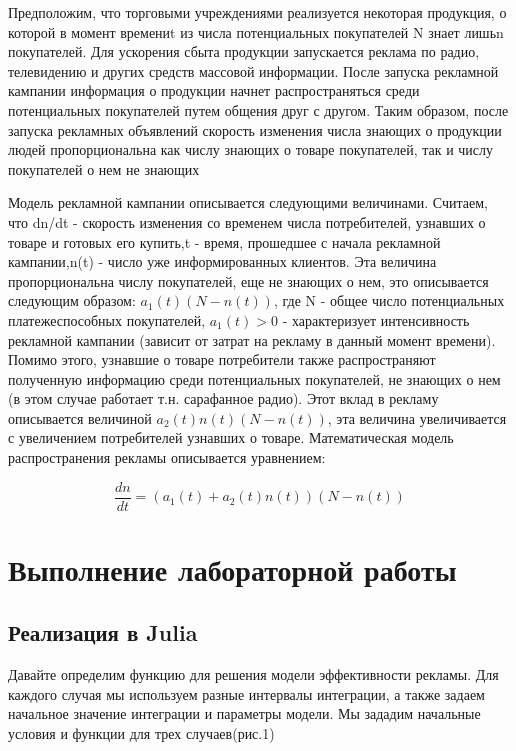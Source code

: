 \documentclass[
  12pt,
  a4paper,
  DIV=11,
  numbers=noendperiod]{scrreprt}
\begin{document}
Предположим, что торговыми учреждениями реализуется некоторая продукция,
о которой в момент времениt из числа потенциальных покупателей N знает
лишьn покупателей. Для ускорения сбыта продукции запускается реклама по
радио, телевидению и других средств массовой информации. После запуска
рекламной кампании информация о продукции начнет распространяться среди
потенциальных покупателей путем общения друг с другом. Таким образом,
после запуска рекламных объявлений скорость изменения числа знающих о
продукции людей пропорциональна как числу знающих о товаре покупателей,
так и числу покупателей о нем не знающих

Модель рекламной кампании описывается следующими величинами. Считаем,
что dn/dt - скорость изменения со временем числа потребителей, узнавших
о товаре и готовых его купить,t - время, прошедшее с начала рекламной
кампании,n(t) - число уже информированных клиентов. Эта величина
пропорциональна числу покупателей, еще не знающих о нем, это описывается
следующим образом: \(a_1(t)(N - n(t))\), где N - общее число
потенциальных платежеспособных покупателей, \(a_1(t) > 0\) -
характеризует интенсивность рекламной кампании (зависит от затрат на
рекламу в данный момент времени). Помимо этого, узнавшие о товаре
потребители также распространяют полученную информацию среди
потенциальных покупателей, не знающих о нем (в этом случае работает т.н.
сарафанное радио). Этот вклад в рекламу описывается величиной
\(a_2(t)n(t)(N - n(t))\), эта величина увеличивается с увеличением
потребителей узнавших о товаре. Математическая модель распространения
рекламы описывается уравнением:

\[
\frac{dn}{dt} = (a_1(t) + a_2(t)n(t))(N - n(t))
\]

\chapter{Выполнение лабораторной
работы}\label{ux432ux44bux43fux43eux43bux43dux435ux43dux438ux435-ux43bux430ux431ux43eux440ux430ux442ux43eux440ux43dux43eux439-ux440ux430ux431ux43eux442ux44b}

\section{Реализация в
Julia}\label{ux440ux435ux430ux43bux438ux437ux430ux446ux438ux44f-ux432-julia}

Давайте определим функцию для решения модели эффективности рекламы. Для
каждого случая мы используем разные интервалы интеграции, а также задаем
начальное значение интеграции и параметры модели. Мы зададим начальные
условия и функции для трех случаев(рис.1)
\end{document}
